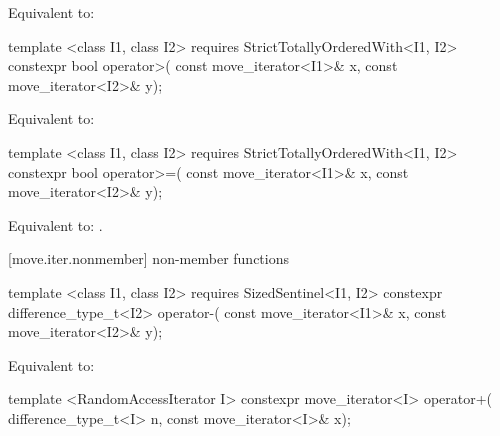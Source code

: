 \begin{itemdescr}
\pnum
\effects Equivalent to:
\end{itemdescr}

%
%
\begin{itemdecl}
template <class I1, class I2>
    requires StrictTotallyOrderedWith<I1, I2>
  constexpr bool operator>(
    const move_iterator<I1>& x, const move_iterator<I2>& y);
\end{itemdecl}

\begin{itemdescr}
\pnum
\effects Equivalent to:
\end{itemdescr}

%
%
\begin{itemdecl}
template <class I1, class I2>
    requires StrictTotallyOrderedWith<I1, I2>
  constexpr bool operator>=(
    const move_iterator<I1>& x, const move_iterator<I2>& y);
\end{itemdecl}

\begin{itemdescr}
\pnum
\effects Equivalent to:
.
\end{itemdescr}

[move.iter.nonmember]{ non-member functions}

%
%
\begin{itemdecl}
template <class I1, class I2>
    requires SizedSentinel<I1, I2>
  constexpr difference_type_t<I2> operator-(
    const move_iterator<I1>& x,
    const move_iterator<I2>& y);
\end{itemdecl}

\begin{itemdescr}
\pnum
\effects Equivalent to:
\end{itemdescr}

%
%
\begin{itemdecl}
template <RandomAccessIterator I>
  constexpr move_iterator<I> operator+(
    difference_type_t<I> n,
    const move_iterator<I>& x);
\end{itemdecl}

